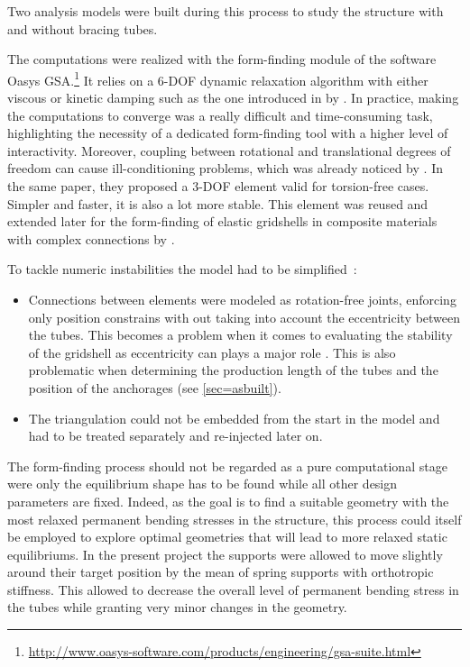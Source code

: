 Two analysis models were built during this process to study the structure with and without bracing tubes.

The computations were realized with the form-finding module of the software Oasys GSA.\footnote{\url{http://www.oasys-software.com/products/engineering/gsa-suite.html}} It relies on a 6-DOF dynamic relaxation algorithm with either viscous or kinetic damping such as the one introduced in \citeyear{Adriaenssens2000} by \citet{Adriaenssens2000}. In practice, making the computations to converge was a really difficult and time-consuming task, highlighting the necessity of a dedicated form-finding tool with a higher level of interactivity. Moreover, coupling between rotational and translational degrees of freedom can cause ill-conditioning problems, which was already noticed by \citet{Adriaenssens2001}. In the same paper, they proposed a 3-DOF element valid for torsion-free cases. Simpler and faster, it is also a lot more stable. This element was reused and extended later for the form-finding of elastic gridshells in composite materials with complex connections by \citet{Douthe2007}.

To tackle numeric instabilities the model had to be simplified~: 
\begin{itemize}
\item Connections between elements were modeled as rotation-free joints, enforcing only position constrains with out taking into account the eccentricity between the tubes. This becomes a problem when it comes to evaluating the stability of the gridshell as eccentricity can plays a major role \cite{Lefevre2015}. This is also problematic when determining the production length of the tubes and the position of the anchorages (see \cref{sec=asbuilt}). 
\item The triangulation could not be embedded from the start in the model and had to be treated separately and re-injected later on.
\end{itemize}


The form-finding process should not be regarded as a pure computational stage were only the equilibrium shape has to be found while all other design parameters are fixed. Indeed, as the goal is to find a suitable geometry with the most relaxed permanent bending stresses in the structure, this process could itself be employed to explore optimal geometries that will lead to more relaxed static equilibriums. In the present project the supports were allowed to move slightly around their target position by the mean of spring supports with orthotropic stiffness. This allowed to decrease the overall level of permanent bending stress in the tubes while granting very minor changes in the geometry.

